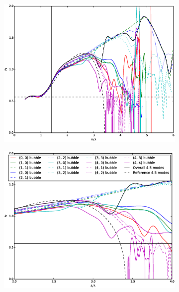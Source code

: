 \begin{figure}
\begin{subfigure}[b]{0.32\textwidth}
  \includegraphics[width=\textwidth]{plts/Fr_long_walls}
\end{subfigure}
\begin{subfigure}[b]{0.32\textwidth}
  \includegraphics[width=\textwidth]{plts/Fr_long_walls_zoom1}
\end{subfigure}
\begin{subfigure}[b]{0.32\textwidth}

\end{subfigure}
\end{figure}
